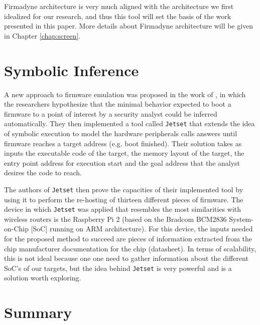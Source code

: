 Firmadyne architecture is very much aligned with the architecture we first idealized for our research, and thus this tool will set the basis of the work presented in this paper. More details about Firmadyne architecture will be given in Chapter \ref{chap:screen}.

\section{Symbolic Inference}

A new approach to firmware emulation was proposed in the work of \cite{jetset}, in which the researchers hypothesize that the minimal behavior expected to boot a firmware to a point of interest by a security analyst could be inferred automatically. They then implemented a tool called {\tt Jetset} that extends the idea of symbolic execution to model the hardware peripherals calls answers until firmware reaches a target address (e.g. boot finished). Their solution takes as inputs the executable code of the target, the memory layout of the target, the entry point address for execution start and the goal address that the analyst desires the code to reach.

The authors of {\tt Jetset} then prove the capacities of their implemented tool by using it to perform the re-hosting of thirteen different pieces of firmware. The device in which {\tt Jetset} was applied that resembles the most similarities with wireless routers is the Raspberry Pi 2 (based on the Bradcom BCM2836 System-on-Chip [SoC] running on ARM architecture). For this device, the inputs needed for the proposed method to succeed are pieces of information extracted from the chip manufacturer documentation for the chip (datasheet). In terms of scalability, this is not ideal because one one need to gather information about the different SoC's of our targets, but the idea behind {\tt Jetset} is very powerful and is a solution worth exploring.

\section{Summary}


